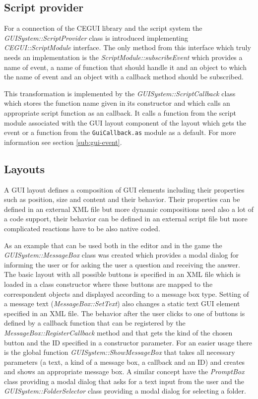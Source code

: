 \subsection{Script provider}
\label{sub:gui-script}

For a connection of the CEGUI library and the script system the \emph{GUISystem::ScriptProvider} class is introduced implementing \emph{CEGUI::ScriptModule} interface. The only method from this interface which truly needs an implementation is the \emph{ScriptModule::subscribeEvent} which provides a name of event, a name of function that should handle it and an object to which the name of event and an object with a callback method should be subscribed.

This transformation is implemented by the \emph{GUISystem::ScriptCallback} class which stores the function name given in its constructor and which calls an appropriate script function as an callback. It calls a function from the script module associated with the GUI layout component of the layout which gets the event or a function from the \verb/GuiCallback.as/ module as a default. For more information see section \ref{sub:gui-event}.

\subsection{Layouts}
\label{sub:gui-layouts}

A GUI layout defines a composition of GUI elements including their properties such as position, size and content and their behavior. Their properties can be defined in an external XML file but more dynamic compositions need also a lot of a code support, their behavior can be defined in an external script file but more complicated reactions have to be also native coded.

As an example that can be used both in the editor and in the game the \emph{GUISystem::MessageBox} class was created which provides a modal dialog for informing the user or for asking the user a question and receiving the answer. The basic layout with all possible buttons is specified in an XML file which is loaded in a class constructor where these buttons are mapped to the correspondent objects and displayed according to a message box type. Setting of a message text (\emph{MessageBox::SetText}) also changes a static text GUI element specified in an XML file. The behavior after the user clicks to one of buttons is defined by a callback function that can be registered by the \emph{MessageBox::RegisterCallback} method and that gets the kind of the chosen button and the ID specified in a constructor parameter. For an easier usage there is the global function \emph{GUISystem::ShowMessageBox} that takes all necessary parameters (a text, a kind of a message box, a callback and an ID) and creates and shows an appropriate message box. A similar concept have the \emph{PromptBox} class providing a modal dialog that asks for a text input from the user and the \emph{GUISystem::FolderSelector} class providing a modal dialog for selecting a folder.

